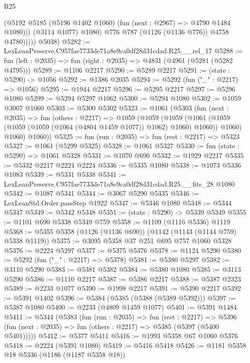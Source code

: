 \begin{lexlean}{R25}
\begin{coremodule}
                    (@5192 @5185 (@5196 @1402 @1060) (fun (next : @2967) => @4790 @1484 @1080)))
                  (@3114 @1077)
                  @1080)
                @776
                @787
                (@1126 (@1136 @776))
                @4758
                @4780)))))
      @5038)
@5282 := LexLeanPreserve.C957fae7733de71a8e9ca0df28d31cdad.R25.__rel_17
@5288 := fun (left : @2035) => fun (right : @2035) => @4831 (@4961 (@5281 (@5282 @4795)))
@5289 := @1106 @2217
@5290 := @5289 @2217
@5291 := (state : @5290) -> @1056
@5292 := @1386 @2035
@5294 := @5292 (fun ("_" : @2217) => @1056)
@5295 := @1944 @2217
@5296 := @5295 @2217
@5297 := @5296 @1080
@5299 := @5294 @5297 @1062
@5300 := @5294 @1080
@5302 := @1059 @3007 @1060
@5303 := @5300 @5302
@5323 := @1061
    (@5303
      (fun (next : @2035) =>
      fun (others : @2217) =>
      @1059
        (@1059
          (@1059
            (@1061 (@1059 (@1059 (@1059 (@1064 (@4804 @1459 @1077)) @1062) @1060) @1060))
            @1060)
          @1060)
        @1060))
@5325 := fun (run : @2035) => fun (rest : @2217) => @5323
@5327 := @1061 (@5299 @5325)
@5328 := @1061 @5327
@5330 := fun (state : @5290) => @1061 @5328
@5331 := @1070 @690
@5332 := @1929 @2217
@5335 := @5332 @2217 @2224 @2224
@5336 := @5335 @1080
@5338 := @1073 @5336 @1083
@5339 := @5331 @5338
@5341 := LexLeanPreserve.C957fae7733de71a8e9ca0df28d31cdad.R25.__fits_28 @1080
@5342 := @1087 @5341
@5344 := @3067 @5290 @5335
@5346 := LexLeanStd.Order.passStep @1922
@5347 := @5346 @1080
@5348 := @5344 @5347
@5349 := @5342 @5348
@5351 := (state : @5290) -> @5339 @5349
@5355 := @1101 @690 @5338 @5349 @759
@5358 := @1109 (@1116 @5336) @1119
@5368 := @5355 @5358 (@1126 (@1136 @690)) (@1142 (@1143 (@1144 @759) @5338 @1119))
@5375 := @3095 @5358 @37 @251 @695 @757 @1060 @5328
@5376 := @2224 @5297
@5377 := @5375 @5376
@5378 := @1124 @5290
@5380 := @5292 (fun ("_" : @2217) => @5378)
@5381 := @5380 @5297
@5382 := @3110 @5290
@5383 := @5381 @5382
@5384 := @5380 @1080
@5385 := @3113 @5290
@5386 := @1110 @2217
@5387 := @5386 @2217
@5388 := @5387 @2323
@5389 := @2233 @1077
@5390 := @1998 @2217
@5391 := @5390 @2217
@5392 := @5391 @1402
@5396 := @5384 (@5385 (@5388 (@5389 @5392)))
@5397 := @5387 @1080
@5400 := @2233 (@4809 @1459 @1077)
@5401 := @5391 @1484
@5411 := @5344
    (@5383
      (fun (run : @2035) =>
      fun (rest : @2217) =>
      @5396 (fun (next : @2035) => fun (others : @2217) => @5385 (@5397 (@5400 @5401)))))
@5412 := @5377 @5411
@5416 := @1993 @5358 @67 @1060 @5376
@5418 := @2224 (@5391 @1080)
@5419 := @5416 @5418
@5426 := @1181 @5358 @18 @5336 (@1186 (@1187 @5358 @18))

\end{coremodule}
\end{lexlean}

